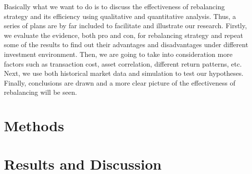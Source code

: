 \documentclass[
10pt, %
a4paper, %
oneside, %
headinclude,footinclude, %
BCOR5mm, %
]{scrartcl}
\begin{document}
Basically what we want to do is to discuss the effectiveness of rebalancing strategy and its efficiency using qualitative and quantitative analysis. Thus, a series of plans are by far included to facilitate and illustrate our research. Firstly, we evaluate the evidence, both pro and con, for rebalancing strategy and repeat some of the results to find out their advantages and disadvantages under different investment environment. Then, we are going to take into consideration more factors such as transaction cost, asset correlation, different return patterns, etc. Next, we use both historical market data and simulation to test our hypotheses. Finally, conclusions are drawn and a more clear picture of the effectiveness of rebalancing will be seen.
 

     
 

\section{Methods}




\section{Results and Discussion}





\renewcommand{\refname}{\spacedlowsmallcaps{References}} %






\end{document}
